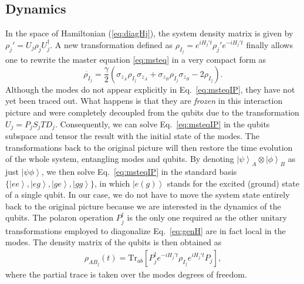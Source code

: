 \documentclass[%
reprint,
amsmath,amssymb,
aps,
pra,
]{revtex4-1}
\newcommand{\ket}[1]{\left| #1 \right>} %
\begin{document}
\subsection{\label{subsec:dyn}Dynamics} 
In the space of Hamiltonian (\ref{eq:diagHj}), the system density matrix is given by $\rho_j'=U_j\rho_jU_j^\dag$. A new transformation defined as $\rho_{I_j}=e^{iH_j't}\rho_j'e^{-iH_j't}$ finally allows one to rewrite the master equation \eqref{eq:msteq} in a very compact form as
\begin{equation}
\dot{\rho_{I_j}}=\frac{\gamma}{2}\left(\sigma_{z_A}\rho_{I_j}\sigma_{z_A}+\sigma_{z_B}\rho_{I_j}\sigma_{z_B}-2\rho_{I_j}\right).
\label{eq:msteqIP}
\end{equation}
Although the modes do not appear explicitly in Eq.~\eqref{eq:msteqIP}, they have not yet been traced out. What happens is that they are \textit{frozen} in this interaction picture and were completely decoupled from the qubits due to the transformation $U_j=P_jS_jTD_j$. Consequently, we can solve Eq.~\eqref{eq:msteqIP} in the qubits subspace and tensor the result with the initial state of the modes. The transformations back to the original picture will then restore the time evolution of the whole system, entangling modes and qubits. By denoting $\ket{\psi}_A\otimes\ket{\phi}_B$ as just $\ket{\psi\phi}$, we then solve Eq.~\eqref{eq:msteqIP} in the standard basis $\{\ket{ee},\ket{eg},\ket{ge},\ket{gg}\}$, in which $\ket{e(g)}$ stands for the excited (ground) state of a single qubit. 
In our case, we do not have to move the system state entirely back to the original picture because we are interested in the dynamics of the qubits. The  polaron operation $P_j^{\dagger}$ is the only one required as the other unitary transformations employed to diagonalize Eq.~\eqref{eq:genH} are in fact local in the modes. The density matrix of the qubits is then obtained as
\begin{eqnarray}
\rho_{AB_j}(t)=\text{Tr}_{ab}\left[P_j^{\dagger}e^{-iH_j't}\rho_{I_j}e^{iH_j't}P_j\right],
\label{eq:rhoAB}
\end{eqnarray}
where the partial trace is taken over the modes degrees of freedom. 
\end{document}
